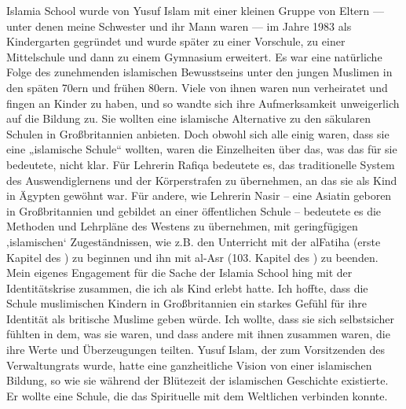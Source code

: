 \documentclass[12pt]{memoir}
\begin{document}
Islamia School wurde von Yusuf Islam mit einer kleinen Gruppe von Eltern —
unter denen meine Schwester und ihr Mann waren —
im Jahre 1983 als Kindergarten gegründet
und wurde später zu einer Vorschule, zu einer Mittelschule
und dann zu einem Gymnasium erweitert.
Es war eine natürliche Folge des zunehmenden islamischen Bewusstseins
unter den jungen Muslimen in den späten 70ern und frühen 80ern.
Viele von ihnen waren nun verheiratet und fingen an Kinder zu haben,
und so wandte sich ihre Aufmerksamkeit unweigerlich auf die Bildung zu.
Sie wollten eine islamische Alternative zu
den säkularen Schulen in Großbritannien anbieten.
Doch obwohl sich alle einig waren, dass sie eine „islamische Schule“ wollten,
waren die Einzelheiten über das, was das für sie bedeutete, nicht klar.
Für Lehrerin Rafiqa bedeutete es, das traditionelle System
des Auswendiglernens und der Körperstrafen zu übernehmen,
an das sie als Kind in Ägypten gewöhnt war.
Für andere, wie Lehrerin Nasir – eine Asiatin geboren in Großbritannien
und gebildet an einer öffentlichen Schule –
bedeutete es die Methoden und Lehrpläne des Westens zu übernehmen,
mit geringfügigen ‚islamischen‘ Zugeständnissen,
wie z.B. den Unterricht mit der al\–Fatiha (erste Kapitel des \Quran)
zu beginnen und ihn mit al-Asr (103. Kapitel des \Quran) zu beenden.
Mein eigenes Engagement für die Sache der Islamia School
hing mit der Identitätskrise zusammen,
die ich als Kind erlebt hatte.
Ich hoffte, dass die Schule muslimischen Kindern in Großbritannien
ein starkes Gefühl für ihre Identität als britische Muslime geben würde.
Ich wollte, dass sie sich selbstsicher fühlten in dem, was sie waren,
und dass andere mit ihnen zusammen waren,
die ihre Werte und Überzeugungen teilten.
Yusuf Islam, der zum Vorsitzenden des Verwaltungrats wurde,
hatte eine ganzheitliche Vision von einer islamischen Bildung,
so wie sie während der Blütezeit der islamischen Geschichte existierte.
Er wollte eine Schule, die das Spirituelle mit dem Weltlichen verbinden konnte.
\end{document}
